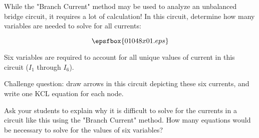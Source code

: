 

While the "Branch Current" method may be used to analyze an unbalanced bridge circuit, it requires a lot of calculation!  In this circuit, determine how many variables are needed to solve for all currents:

$$\epsfbox{01048x01.eps}$$







Six variables are required to account for all unique values of current in this circuit ($I_1$ through $I_6$).

\vskip 10pt

Challenge question: draw arrows in this circuit depicting these six currents, and write one KCL equation for each node.







Ask your students to explain why it is difficult to solve for the currents in a circuit like this using the "Branch Current" method.  How many equations would be necessary to solve for the values of six variables?



